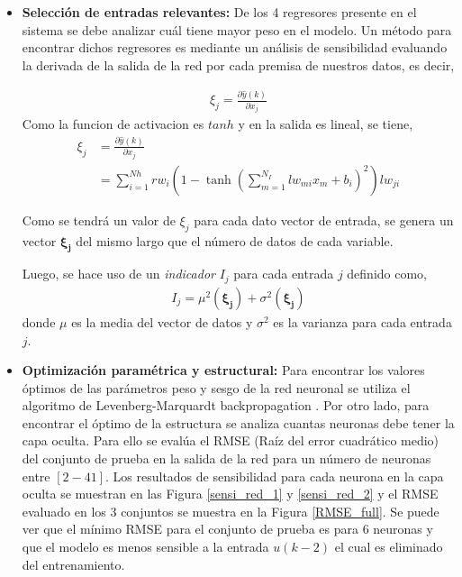 \documentclass[12pt]{article}
\begin{document}
\begin{itemize}
	
	\item \textbf{Selección de entradas relevantes:} De los 4 regresores presente en el sistema se debe analizar cuál tiene mayor peso en el modelo. Un método para encontrar dichos regresores es mediante un análisis de sensibilidad evaluando la derivada de la salida de la red por cada premisa de nuestros datos, es decir,
	
	\begin{align}
	\xi_j = \frac{\partial \hat{y}(k)}{\partial x_j}		
	\end{align}
	Como la funcion de activacion es $tanh$ y en la salida es lineal, se tiene,
	\begin{align}
	\xi_j &= \frac{\partial \hat{y}(k)}{\partial x_j} \nonumber \\
	&= \sum_{i=1}^{Nh} rw_i \left(1 - \tanh\left(\sum_{m=1}^{N_I} lw_{mi} x_m + b_i\right)^2 \right) lw_{ji}		
	\end{align}
	
	Como se tendrá un valor de $\xi_j$ para cada dato vector de entrada, se genera un vector $\boldsymbol{\xi_j}$ del mismo largo que el número de datos de cada variable.
	
	Luego, se hace uso de un \textit{indicador} $I_j$ para cada entrada $j$ definido como,
	\begin{align}
	I_j = \mu^2 (\boldsymbol{\xi_j}) + \sigma^2(\boldsymbol{\xi_j})
	\end{align}
	donde $\mu$ es la media del vector de datos y $\sigma^2$ es la varianza para cada entrada $j$.
	
	\item \textbf{Optimización paramétrica y estructural:} Para encontrar los valores óptimos de las parámetros peso y sesgo de la red neuronal se utiliza el algoritmo de Levenberg-Marquardt backpropagation \cite{matlab_train}. Por otro lado, para encontrar el óptimo de la estructura se analiza cuantas neuronas debe tener la capa oculta. Para ello se evalúa el RMSE (Raíz del error cuadrático medio) del conjunto de prueba en la salida de la red para un número de neuronas entre $[2-41]$. Los resultados de sensibilidad para cada neurona en la capa oculta se muestran en las Figura \ref{sensi_red_1} y \ref{sensi_red_2} y el RMSE evaluado en los 3 conjuntos se muestra en la Figura \ref{RMSE_full}. Se puede ver que el mínimo RMSE para el conjunto de prueba es para $6$ neuronas y que el modelo es menos sensible  a la entrada $u(k-2)$ el cual es eliminado del entrenamiento.
	

\end{itemize}
\end{document}
